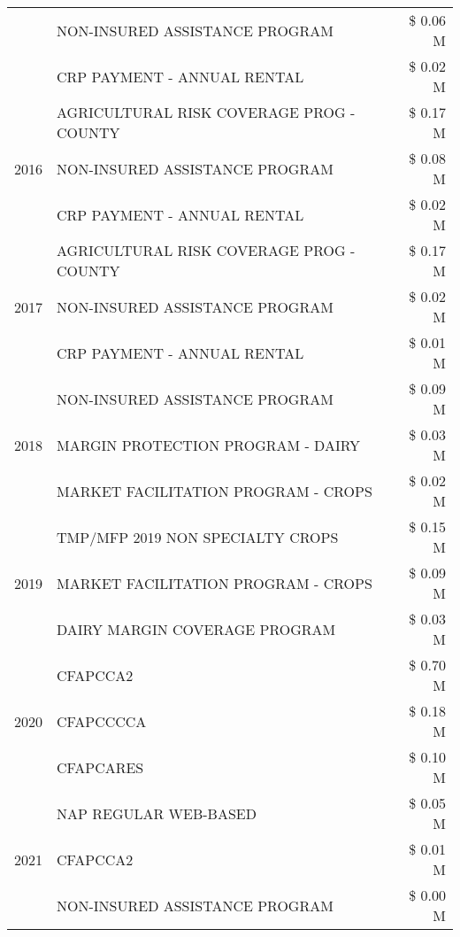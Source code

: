 \begin{tabular}{llr}
 & NON-INSURED ASSISTANCE PROGRAM & \$ 0.06 M \\
 & CRP PAYMENT - ANNUAL RENTAL & \$ 0.02 M \\
\cline{1-3}
\multirow[t]{3}{*}{2016} & AGRICULTURAL RISK COVERAGE PROG - COUNTY & \$ 0.17 M \\
 & NON-INSURED ASSISTANCE PROGRAM & \$ 0.08 M \\
 & CRP PAYMENT - ANNUAL RENTAL & \$ 0.02 M \\
\cline{1-3}
\multirow[t]{3}{*}{2017} & AGRICULTURAL RISK COVERAGE PROG - COUNTY & \$ 0.17 M \\
 & NON-INSURED ASSISTANCE PROGRAM & \$ 0.02 M \\
 & CRP PAYMENT - ANNUAL RENTAL & \$ 0.01 M \\
\cline{1-3}
\multirow[t]{3}{*}{2018} & NON-INSURED ASSISTANCE PROGRAM & \$ 0.09 M \\
 & MARGIN PROTECTION PROGRAM - DAIRY & \$ 0.03 M \\
 & MARKET FACILITATION PROGRAM - CROPS & \$ 0.02 M \\
\cline{1-3}
\multirow[t]{3}{*}{2019} & TMP/MFP 2019 NON SPECIALTY CROPS & \$ 0.15 M \\
 & MARKET FACILITATION PROGRAM - CROPS & \$ 0.09 M \\
 & DAIRY MARGIN COVERAGE PROGRAM & \$ 0.03 M \\
\cline{1-3}
\multirow[t]{3}{*}{2020} & CFAPCCA2 & \$ 0.70 M \\
 & CFAPCCCCA & \$ 0.18 M \\
 & CFAPCARES & \$ 0.10 M \\
\cline{1-3}
\multirow[t]{3}{*}{2021} & NAP REGULAR WEB-BASED & \$ 0.05 M \\
 & CFAPCCA2 & \$ 0.01 M \\
 & NON-INSURED ASSISTANCE PROGRAM & \$ 0.00 M \\
\cline{1-3}
\bottomrule
\end{tabular}
